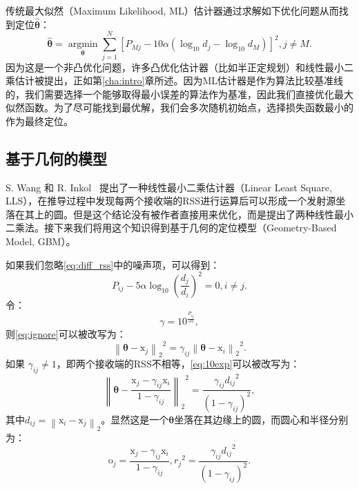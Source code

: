 传统最大似然（Maximum Likelihood, ML）估计器通过求解如下优化问题从而找到定位$\bm{\hat{\theta}}$：
\begin{equation}
\widehat {\bm{\theta }} = \mathop {\arg \min }\limits_{\bm{\theta }} \sum\limits_{j = 1}^N {{{[{P_{Mj}} - 10\alpha ({{\log }_{10}}d_j - {{\log }_{10}}d_M)]}^2}}, j \neq M. \label{eq:ml}
\end{equation}
因为这是一个非凸优化问题，许多凸优化估计器（比如半正定规划）和线性最小二乘估计被提出，正如第\ref{cha:intro}章所述。因为ML估计器是作为算法比较基准线的，我们需要选择一个能够取得最小误差的算法作为基准，因此我们直接优化最大似然函数。为了尽可能找到最优解，我们会多次随机初始点，选择损失函数最小的作为最终定位。

\subsection{基于几何的模型}

S. Wang 和 R. Inkol~\cite{wang2011near} 提出了一种线性最小二乘估计器（Linear Least Square, LLS），在推导过程中发现每两个接收端的RSS进行运算后可以形成一个发射源坐落在其上的圆。但是这个结论没有被作者直接用来优化，而是提出了两种线性最小二乘法。接下来我们将用这个知识得到基于几何的定位模型（Geometry-Based Model, GBM）。

如果我们忽略\eqref{eq:diff_rss}中的噪声项，可以得到：
\begin{equation}
{P_{ij}} - 5\alpha {\log _{10}}({\dfrac{d_j}{d_i}})^2 = 0, i \neq j. \label{eq:ignore}
\end{equation}
令：
\begin{equation}
\gamma = 10^{\frac{P_{ij}}{5\alpha}}, \label{eq:gamma}
\end{equation}
则\eqref{eq:ignore}可以被改写为：
\begin{equation}
{\left\| {\bm{\theta}  - \bm{\mathrm{x}}_j} \right\|_2}^2 = {\gamma _{ij}}{\left\| {\bm{\theta}  - \bm{\mathrm{x}}_i} \right\|_2}^2. \label{eq:10exp}
\end{equation}
如果 $\gamma _{ij} \neq 1$，即两个接收端的RSS不相等，\eqref{eq:10exp}可以被改写为：
\begin{equation}
{\left\| {\bm{\theta}  - \frac{\bm{\mathrm{x}}_j - \gamma_{ij}\bm{\mathrm{x}}_i}{1 - \gamma_{ij}}} \right\|_2}^2 = \frac{\gamma_{ij}{d_{ij}}^2}{(1 - \gamma_{ij})^2}, \label{eq:circle}
\end{equation}
其中$d_{ij} = \left\| \bm{\mathrm{x}}_i  - \bm{\mathrm{x}}_j \right\|_2$。显然这是一个$\bm{\theta}$坐落在其边缘上的圆，而圆心和半径分别为：
\begin{equation}
\bm{\mathrm{o}}_j = \frac{\bm{\mathrm{x}}_j - \gamma_{ij}\bm{\mathrm{x}}_i}{1 - \gamma_{ij}}, {r_j}^2 = \frac{\gamma_{ij}{d_{ij}}^2}{(1 - \gamma_{ij})^2}. \label{eq:oR}
\end{equation}

